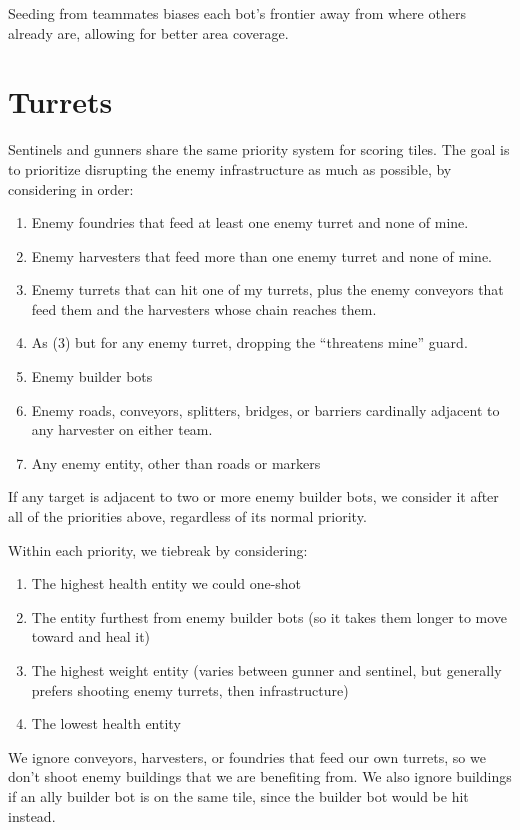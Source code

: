 \documentclass[10pt,sigconf,nonacm]{acmart}
\begin{document}
Seeding from teammates biases each bot's frontier away from where
others already are, allowing for better area coverage.

\section{Turrets}

Sentinels and gunners share the same priority system for scoring tiles. The goal is to prioritize disrupting the enemy infrastructure as much as possible, by considering in order:

\begin{enumerate}
  \item Enemy foundries that feed at least one enemy turret and none of mine.
  \item Enemy harvesters that feed more than one enemy turret and none of mine.
  \item Enemy turrets that can hit one of my turrets, plus the enemy conveyors that feed them and the harvesters whose chain reaches them.
  \item As (3) but for any enemy turret, dropping the ``threatens mine'' guard.
  \item Enemy builder bots
  \item Enemy roads, conveyors, splitters, bridges, or barriers cardinally adjacent to any harvester on either team.
  \item Any enemy entity, other than roads or markers
\end{enumerate}

If any target is adjacent to two or more enemy builder bots, we consider it after all of the priorities above, regardless of its normal priority.

Within each priority, we tiebreak by considering:

\begin{enumerate}
  \item The highest health entity we could one-shot
  \item The entity furthest from enemy builder bots (so it takes them longer to move toward and heal it)
  \item The highest weight entity (varies between gunner and sentinel, but generally prefers shooting enemy turrets, then infrastructure)
  \item The lowest health entity
\end{enumerate}

We ignore conveyors, harvesters, or foundries that feed our own turrets, so we don't shoot enemy buildings that we are benefiting from. We also ignore buildings if an ally builder bot is on the same tile, since the builder bot would be hit instead.
\end{document}

